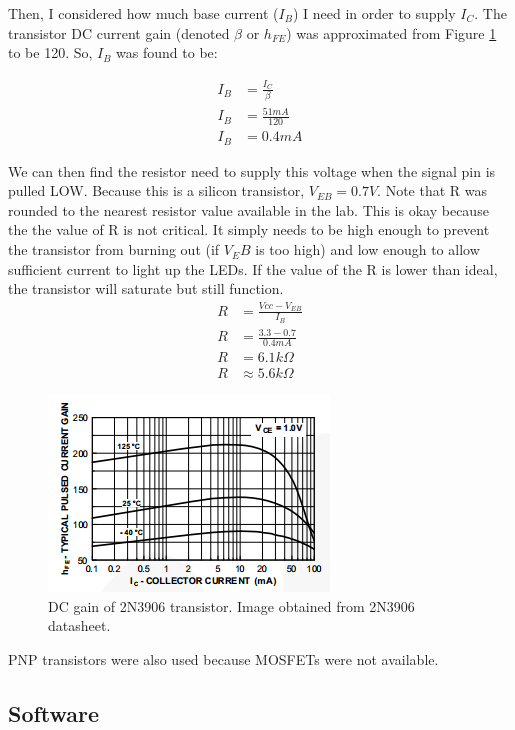 \documentclass[11pt]{article}
\begin{document}
Then, I considered how much base current ($I_{B}$) I need in order to supply $I_{C}$. The transistor DC current gain (denoted $\beta$ or $h_{FE}$) was approximated from Figure \ref{fig:2N3906_gain} to be 120. So, $I_{B}$ was found to be: 

\begin{align*}
I_{B} &= \frac{I_{C}}{\beta} \\
I_{B} &= \frac{51mA}{120} \\
I_{B} &= 0.4mA
\end{align*}

We can then find the resistor need to supply this voltage when the signal pin is pulled LOW. Because this is a silicon transistor, $V_{EB}=0.7V$.  Note that R was rounded to the nearest resistor value available in the lab. This is okay because the the value of R is not critical. It simply needs to be high enough to prevent the transistor from burning out (if $V_EB$ is too high) and low enough to allow sufficient current to light up the LEDs. If the value of the R is lower than ideal, the transistor will saturate but still function. \\

\begin{align*}
R &= \frac{Vcc-V_{EB}}{I_{B}} \\
R &= \frac{3.3-0.7}{0.4mA} \\
R &= 6.1k\Omega	\\
R &\approx 5.6k\Omega
\end{align*}



\begin{figure}[h!]
\centering
\includegraphics[scale=1]{2N3906_gain.png}
\caption{DC gain of 2N3906 transistor. Image obtained from 2N3906 datasheet.}
\label{fig:2N3906_gain}
\end{figure} 


PNP transistors were also used because MOSFETs were not available. 

\subsection{Software}
\end{document}
